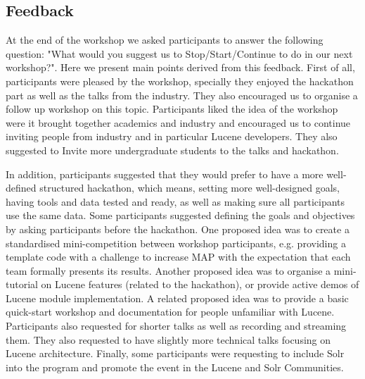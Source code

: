 \subsection{Feedback}

At the end of the workshop we asked participants to answer the following question: "What would you suggest us to Stop/Start/Continue to do in our next workshop?". 
Here we present main points derived from this feedback. 
First of all, participants were pleased by the workshop, specially they enjoyed the hackathon part as well as the talks from the industry. 
They also encouraged us to organise a follow up workshop on this topic.   
Participants liked the idea of the workshop were it brought together academics and industry and encouraged us to continue inviting people from industry and in particular Lucene developers.
They also suggested to Invite more undergraduate students to the talks and hackathon.  

In addition, participants suggested that they would prefer to have a more well-defined structured hackathon, which means, setting more well-designed goals, having tools and data tested and ready, as well as making sure all participants use the same data. 
Some participants suggested defining the goals and objectives by asking participants before the hackathon. 
One proposed idea was to create a standardised mini-competition between workshop participants, e.g. providing a template code with a challenge to increase MAP with the expectation that each team formally presents its results.
Another proposed idea was to organise a mini-tutorial on Lucene features (related to the hackathon), or provide active demos of Lucene module implementation. 
A related proposed idea was to provide a basic quick-start workshop and documentation for people unfamiliar with Lucene. 
Participants also requested for shorter talks as well as recording and streaming them. 
They also requested to have slightly more technical talks focusing on Lucene architecture. 
Finally, some participants were requesting to include Solr into the program and promote the event in the Lucene and Solr Communities.
